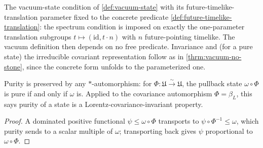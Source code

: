 \begin{definition}
    \label{def:vacuum-state-concrete}
    \leanok
    The vacuum-state condition of \ref{def:vacuum-state} with its future-timelike-translation parameter fixed to the concrete predicate \ref{def:future-timelike-translation}: the spectrum condition is imposed on exactly the one-parameter translation subgroups $t \mapsto (\mathrm{id}, t \cdot n)$ with $n$ future-pointing timelike. The vacuum definition then depends on no free predicate. Invariance and (for a pure state) the irreducible covariant representation follow as in \ref{thrm:vacuum-no-stone}, since the concrete form unfolds to the parameterized one.
\end{definition}

\begin{theorem}
    \label{thrm:purity-covariance-invariant}
    \leanok
    Purity is preserved by any $*$-automorphism: for $\Phi : \mathfrak{U} \xrightarrow{\sim} \mathfrak{U}$, the pullback state $\omega \circ \Phi$ is pure if and only if $\omega$ is. Applied to the covariance automorphism $\Phi = \beta_L$, this says purity of a state is a Lorentz-covariance-invariant property.
\end{theorem}
\begin{proof}
    \leanok
    A dominated positive functional $\psi \le \omega \circ \Phi$ transports to $\psi \circ \Phi^{-1} \le \omega$, which purity sends to a scalar multiple of $\omega$; transporting back gives $\psi$ proportional to $\omega \circ \Phi$.
\end{proof}

